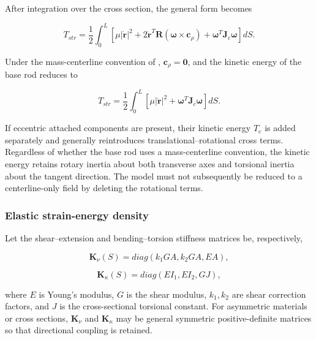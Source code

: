 After integration over the cross section, the general form becomes

\begin{equation}
\label{eq:rod-1-29}
T_{str} = \frac{1}{2}\int_{0}^{L}\left\lbrack \mu\left| \dot{\mathbf{r}} \right|^{2} + 2{\dot{\mathbf{r}}}^{T}\mathbf{R}\left( \bm{\omega} \times \mathbf{c}_{\rho} \right) + \bm{\omega}^{T}\mathbf{J}_{c}\bm{\omega} \right\rbrack dS.
\end{equation}

Under the mass-centerline convention of , \(\mathbf{c}_{\rho} = \mathbf{0}\), and the kinetic energy of the base rod reduces to

\begin{equation}
\label{eq:rod-1-30}
\boxed{T_{str} = \frac{1}{2}\int_{0}^{L}\left\lbrack \mu\left| \dot{\mathbf{r}} \right|^{2} + \bm{\omega}^{T}\mathbf{J}_{c}\bm{\omega} \right\rbrack dS.}
\end{equation}

If eccentric attached components are present, their kinetic energy \(T_{e}\) is added separately and generally reintroduces translational--rotational cross terms. Regardless of whether the base rod uses a mass-centerline convention, the kinetic energy retains rotary inertia about both transverse axes and torsional inertia about the tangent direction. The model must not subsequently be reduced to a centerline-only field by deleting the rotational terms.

\subsubsection{Elastic strain-energy density}\label{sec:rod-1-3-3}

Let the shear--extension and bending--torsion stiffness matrices be, respectively,

\begin{equation}
\label{eq:rod-1-31}
\mathbf{K}_{\nu}(S) = diag\left( k_{1}GA,k_{2}GA,EA \right),
\end{equation}

\begin{equation}
\label{eq:rod-1-32}
\mathbf{K}_{\kappa}(S) = diag\left( EI_{1},EI_{2},GJ \right),
\end{equation}

where \(E\) is Young's modulus, \(G\) is the shear modulus, \(k_{1},k_{2}\) are shear correction factors, and \(J\) is the cross-sectional torsional constant. For asymmetric materials or cross sections, \(\mathbf{K}_{\nu}\) and \(\mathbf{K}_{\kappa}\) may be general symmetric positive-definite matrices so that directional coupling is retained.

